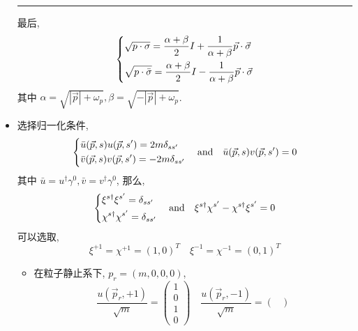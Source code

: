\begin{itemize}
\begin{tcolorbox}[title=proof:]
		\noindent\rule[0.5ex]{\linewidth}{0.5pt} %
		
		最后,
		\begin{equation}
			\begin{dcases}
				\sqrt{p \cdot \sigma} = \frac{\alpha + \beta}{2} I + \frac{1}{\alpha + \beta} \vec{p} \cdot \vec{\sigma} \\
				\sqrt{p \cdot \bar{\sigma}} = \frac{\alpha + \beta}{2} I - \frac{1}{\alpha + \beta} \vec{p} \cdot \vec{\sigma}
			\end{dcases}
		\end{equation}
		其中 $\alpha = \sqrt{|\vec{p}| + \omega_p}, \beta = \sqrt{- |\vec{p}| + \omega_p}$.
	\end{tcolorbox}
	
	\item 选择归一化条件,
	\begin{equation}
		\begin{dcases}
			\bar{u}(\vec{p}, s) u(\vec{p}, s') = 2 m \delta_{s s'} \\
			\bar{v}(\vec{p}, s) v(\vec{p}, s') = - 2 m \delta_{s s'}
		\end{dcases} \quad \text{and} \quad \bar{u}(\vec{p}, s) v(\vec{p}, s') = 0
	\end{equation}
	其中 $\bar{u} = u^\dag \gamma^0, \bar{v} = v^\dag \gamma^0$, 那么,
	\begin{equation}
		\begin{dcases}
			\xi^{s \dag} \xi^{s'} = \delta_{s s'} \\
			\chi^{s \dag} \chi^{s'} = \delta_{s s'}
		\end{dcases} \quad \text{and} \quad \xi^{s \dag} \chi^{s'} - \chi^{s \dag} \xi^{s'} = 0
	\end{equation}
	可以选取,
	\begin{equation}
		\xi^{+ 1} = \chi^{+ 1} = (1, 0)^T \quad \xi^{- 1} = \chi^{- 1} = (0, 1)^T
	\end{equation}
	\begin{itemize}
		\item 在粒子静止系下, $p_r = (m, 0, 0, 0)$,
		\begin{equation}
			\frac{u(\vec{p}_r, + 1)}{\sqrt{m}} = \begin{pmatrix}
				1 \\
				0 \\
				1 \\
				0
			\end{pmatrix} \quad \frac{u(\vec{p}_r, - 1)}{\sqrt{m}} = \begin{pmatrix}

\end{pmatrix}
\end{equation}
\end{itemize}
\end{itemize}
